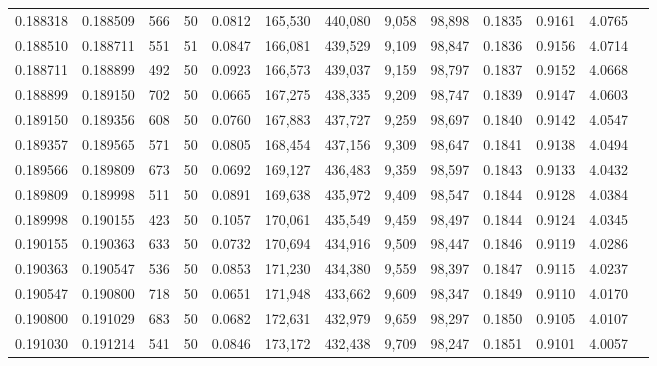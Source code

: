 \begin{tabular}{rrrrrrrrrrrrr}
0.188318 & 0.188509 &   566 &  50 &                                     0.0812 & 165,530 & 440,080 &   9,058 &  98,898 & 0.1835 & 0.9161 & 4.0765 \\
0.188510 & 0.188711 &   551 &  51 &                                     0.0847 & 166,081 & 439,529 &   9,109 &  98,847 & 0.1836 & 0.9156 & 4.0714 \\
0.188711 & 0.188899 &   492 &  50 &                                     0.0923 & 166,573 & 439,037 &   9,159 &  98,797 & 0.1837 & 0.9152 & 4.0668 \\
0.188899 & 0.189150 &   702 &  50 &                                     0.0665 & 167,275 & 438,335 &   9,209 &  98,747 & 0.1839 & 0.9147 & 4.0603 \\
0.189150 & 0.189356 &   608 &  50 &                                     0.0760 & 167,883 & 437,727 &   9,259 &  98,697 & 0.1840 & 0.9142 & 4.0547 \\
0.189357 & 0.189565 &   571 &  50 &                                     0.0805 & 168,454 & 437,156 &   9,309 &  98,647 & 0.1841 & 0.9138 & 4.0494 \\
0.189566 & 0.189809 &   673 &  50 &                                     0.0692 & 169,127 & 436,483 &   9,359 &  98,597 & 0.1843 & 0.9133 & 4.0432 \\
0.189809 & 0.189998 &   511 &  50 &                                     0.0891 & 169,638 & 435,972 &   9,409 &  98,547 & 0.1844 & 0.9128 & 4.0384 \\
0.189998 & 0.190155 &   423 &  50 &                                     0.1057 & 170,061 & 435,549 &   9,459 &  98,497 & 0.1844 & 0.9124 & 4.0345 \\
0.190155 & 0.190363 &   633 &  50 &                                     0.0732 & 170,694 & 434,916 &   9,509 &  98,447 & 0.1846 & 0.9119 & 4.0286 \\
0.190363 & 0.190547 &   536 &  50 &                                     0.0853 & 171,230 & 434,380 &   9,559 &  98,397 & 0.1847 & 0.9115 & 4.0237 \\
0.190547 & 0.190800 &   718 &  50 &                                     0.0651 & 171,948 & 433,662 &   9,609 &  98,347 & 0.1849 & 0.9110 & 4.0170 \\
0.190800 & 0.191029 &   683 &  50 &                                     0.0682 & 172,631 & 432,979 &   9,659 &  98,297 & 0.1850 & 0.9105 & 4.0107 \\
0.191030 & 0.191214 &   541 &  50 &                                     0.0846 & 173,172 & 432,438 &   9,709 &  98,247 & 0.1851 & 0.9101 & 4.0057 \\

\end{tabular}
